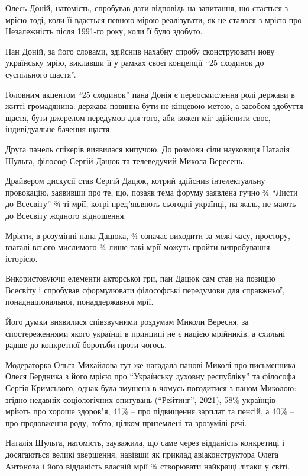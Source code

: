 Олесь Доній, натомість, спробував дати відповідь на запитання, що стається з
мрією тоді, коли її вдається певною мірою реалізувати, як це сталося з мрією
про Незалежність після 1991-го року, коли її було здобуто. 

Пан Доній, за його словами, здійснив нахабну спробу сконструювати нову
українську мрію, виклавши її у рамках своєї концепції \enquote{25 сходинок до
суспільного щастя}. 

Головним акцентом \enquote{25 сходинок} пана Донія є переосмислення ролі
держави в житті громадянина: держава повинна бути не кінцевою метою, а засобом
здобуття щастя, бути джерелом передумов для того, аби кожен міг здійснити своє,
індивідуальне бачення щастя.

Друга панель спікерів виявилася кипучою. До розмови сіли науковиця Наталія
Шульга, філософ Сергій Дацюк та телеведучий Микола Вересень. 

Драйвером дискусії став Сергій Дацюк, котрий здійснив інтелектуальну
провокацію, заявивши про те, що, позаяк тема форуму заявлена гучно ¾
\enquote{Листи до Всесвіту} ¾ ті мрії, котрі предʼявляють сьогодні українці, на
жаль, не мають до Всесвіту жодного відношення. 

Мріяти, в розумінні пана Дацюка, ¾ означає виходити за межі часу, простору,
взагалі всього мислимого ¾ лише такі мрії можуть пройти випробування історією. 

Використовуючи елементи акторської гри, пан Дацюк сам став на позицію Всесвіту
і спробував сформулювати філософські передумови для справжньої,
понаднаціональної, понаддержавної мрії. 

Його думки виявилися співзвучними роздумам Миколи Вересня, за спостереженнями
якого українці в принципі не є нацією мрійників, а схильні радше до конкретної
боротьби проти чогось. 

Модераторка Ольга Михайлова тут же нагадала панові Миколі про письменника Олеся
Бердника з його мрією про \enquote{Українську духовну республіку} та філософа
Сергія Кримського, однак була змушена в чомусь погодитися з паном Миколою:
згідно недавніх соціологічних опитувань (\enquote{Рейтинг}, 2021), 58\%
українців мріють про хороше здоровʼя, 41\% – про підвищення зарплат та пенсій,
а 40\% – про продовження роду, тобто, цілком приземлені та зрозумілі речі. 

Наталія Шульга, натомість, зауважила, що саме через відданість конкретиці і
досягаються великі звершення, навівши як приклад авіаконструктора Олега
Антонова і його відданість власній мрії ¾ створювати найкращі літаки у світі. 

